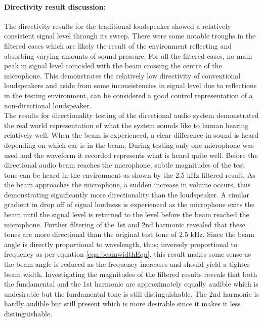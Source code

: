 \paragraph{Directivity result discussion:}
The directivity results for the traditional loudspeaker showed a relatively consistent signal level through its sweep. There were some notable troughs in the filtered cases which are likely the result of the environment reflecting and absorbing varying amounts of sound pressure. For all the filtered cases, no main peak in signal level coincided with the beam crossing the centre of the microphone. This demonstrates the relatively low directivity of conventional loudspeakers and aside from some inconsistencies in signal level due to reflections in the testing environment, can be considered a good control representation of a non-directional loudspeaker.\\
The results for directionality testing of the directional audio system demonstrated the real world representation of what the system sounds like to human hearing relatively well. When the beam is experienced, a clear difference in sound is heard depending on which ear is in the beam. During testing only one microphone was used and the waveform it recorded represents what is heard quite well. Before the directional audio beam reaches the microphone, subtle magnitudes of the test tone can be heard in the environment as shown by the 2.5 kHz filtered result. As the beam approaches the microphone, a sudden increase in volume occurs, thus demonstrating significantly more directionality than the loudspeaker. A similar gradient in drop off of signal loudness is experienced as the microphone exits the beam until the signal level is returned to the level before the beam reached the microphone. Further filtering of the 1st and 2nd harmonic revealed that these tones are more directional than the original test tone of 2.5 kHz. Since the beam angle is directly proportional to wavelength, thus; inversely proportional to frequency as per equation \ref{eqn:beamwidthEqn}, this result makes some sense as the beam angle is reduced as the frequency increases and should yield a tighter beam width. Investigating the magnitudes of the filtered results reveals that both the fundamental and the 1st harmonic are approximately equally audible which is undesirable but the fundamental tone is still distinguishable. The 2nd harmonic is hardly audible but still present which is more desirable since it makes it less distinguishable.


